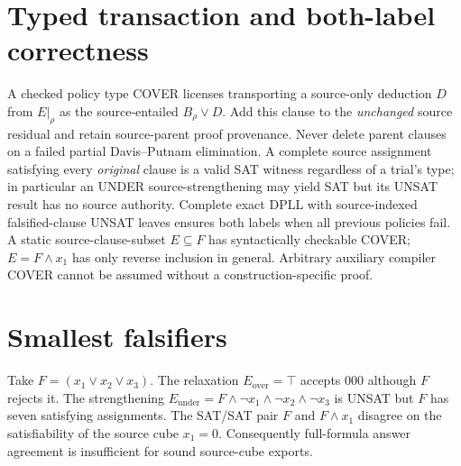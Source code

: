 \documentclass[11pt]{article}
\begin{document}
\section{Typed transaction and both-label correctness}
A checked policy type COVER licenses transporting a source-only deduction $D$ from $E|_\rho$ as the source-entailed $B_\rho\lor D$. Add this clause to the \emph{unchanged} source residual and retain source-parent proof provenance. Never delete parent clauses on a failed partial Davis--Putnam elimination. A complete source assignment satisfying every \emph{original} clause is a valid SAT witness regardless of a trial's type; in particular an UNDER source-strengthening may yield SAT but its UNSAT result has no source authority. Complete exact DPLL with source-indexed falsified-clause UNSAT leaves ensures both labels when all previous policies fail. A static source-clause-subset $E\subseteq F$ has syntactically checkable COVER; $E=F\wedge x_1$ has only reverse inclusion in general. Arbitrary auxiliary compiler COVER cannot be assumed without a construction-specific proof.
\section{Smallest falsifiers}
Take $F=(x_1\vee x_2\vee x_3)$. The relaxation $E_{\mathrm{over}}=\top$ accepts $000$ although $F$ rejects it. The strengthening $E_{\mathrm{under}}=F\wedge\neg x_1\wedge\neg x_2\wedge\neg x_3$ is UNSAT but $F$ has seven satisfying assignments. The SAT/SAT pair $F$ and $F\wedge x_1$ disagree on the satisfiability of the source cube $x_1=0$. Consequently full-formula answer agreement is insufficient for sound source-cube exports.
\end{document}
